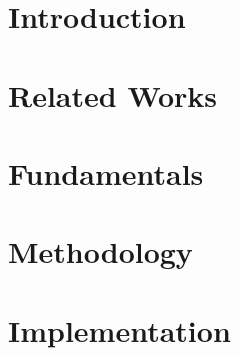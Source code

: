 \documentclass[fleqn]{report}
\author[1]{Giriraj Sukumar Pawar}
\begin{document}




\newpage


\newpage

\tableofcontents
\newpage

\listoffigures
\newpage

\listoftables
\newpage

\listofalgorithms
\newpage


\newpage

%

\chapter{Introduction}
    \label{introduction}
    
\newpage

\chapter{Related Works}
    \label{relatedworks}
    
\newpage    


\chapter{Fundamentals}
    \label{fundamentals}
    
\newpage

\chapter{Methodology}
    \label{methodology}
    
\newpage

\chapter{Implementation}
    \label{implementation}
    
\newpage
\end{document}
